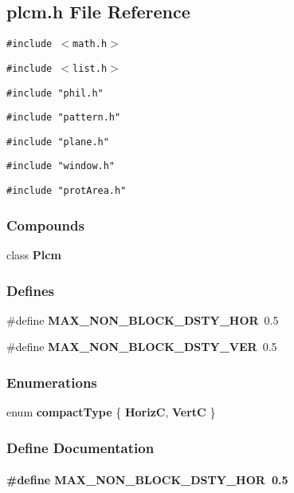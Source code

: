 \subsection{plcm.h File Reference}
\label{plcm.h}
{\tt \#include $<$math.h$>$}\par
{\tt \#include $<$list.h$>$}\par
{\tt \#include "phil.h"}\par
{\tt \#include "pattern.h"}\par
{\tt \#include "plane.h"}\par
{\tt \#include "window.h"}\par
{\tt \#include "prot\-Area.h"}\par
\subsubsection*{Compounds}
\begin{CompactItemize}
\item 
class {\bf Plcm}
\end{CompactItemize}
\subsubsection*{Defines}
\begin{CompactItemize}
\item 
\#define {\bf MAX\_\-NON\_\-BLOCK\_\-DSTY\_\-HOR}\ 0.5
\item 
\#define {\bf MAX\_\-NON\_\-BLOCK\_\-DSTY\_\-VER}\ 0.5
\end{CompactItemize}
\subsubsection*{Enumerations}
\begin{CompactItemize}
\item 
enum {\bf compact\-Type} \{ {\bf Horiz\-C}, 
{\bf Vert\-C}
 \}
\end{CompactItemize}


\subsubsection{Define Documentation}
\label{plcm.h_a0}
\paragraph{\setlength{\rightskip}{0pt plus 5cm}\#define MAX\_\-NON\_\-BLOCK\_\-DSTY\_\-HOR\ 0.5}\hfill



